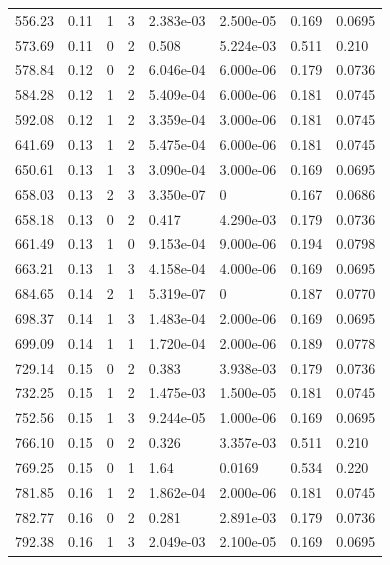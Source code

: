 \documentclass[preview]{standalone}
\begin{document}
{{{\begin{tabular}{L{1.2cm}C{1.2cm} C{0.3cm}C{0.5cm} C{1.4cm}C{1.4cm} C{1.4cm}C{1.4cm}}
  556.23  &  0.11  & 1     &  3 &  2.383e-03  & 2.500e-05  & 0.169 &  0.0695   \\ 
  573.69  &  0.11  & 0     &  2 &  0.508  & 5.224e-03  & 0.511 &  0.210   \\ 
  578.84  &  0.12  & 0     &  2 &  6.046e-04  & 6.000e-06  & 0.179 &  0.0736   \\ 
  584.28  &  0.12  & 1     &  2 &  5.409e-04  & 6.000e-06  & 0.181 &  0.0745   \\ 
  592.08  &  0.12  & 1     &  2 &  3.359e-04  & 3.000e-06  & 0.181 &  0.0745   \\ 
  641.69  &  0.13  & 1     &  2 &  5.475e-04  & 6.000e-06  & 0.181 &  0.0745   \\ 
  650.61  &  0.13  & 1     &  3 &  3.090e-04  & 3.000e-06  & 0.169 &  0.0695   \\ 
  658.03  &  0.13  & 2     &  3 &  3.350e-07  & 0  & 0.167 &  0.0686   \\ 
  658.18  &  0.13  & 0     &  2 &  0.417  & 4.290e-03  & 0.179 &  0.0736   \\ 
  661.49  &  0.13  & 1     &  0 &  9.153e-04  & 9.000e-06  & 0.194 &  0.0798   \\ 
  663.21  &  0.13  & 1     &  3 &  4.158e-04  & 4.000e-06  & 0.169 &  0.0695   \\ 
  684.65  &  0.14  & 2     &  1 &  5.319e-07  & 0  & 0.187 &  0.0770   \\ 
  698.37  &  0.14  & 1     &  3 &  1.483e-04  & 2.000e-06  & 0.169 &  0.0695   \\ 
  699.09  &  0.14  & 1     &  1 &  1.720e-04  & 2.000e-06  & 0.189 &  0.0778   \\ 
  729.14  &  0.15  & 0     &  2 &  0.383  & 3.938e-03  & 0.179 &  0.0736   \\ 
  732.25  &  0.15  & 1     &  2 &  1.475e-03  & 1.500e-05  & 0.181 &  0.0745   \\ 
  752.56  &  0.15  & 1     &  3 &  9.244e-05  & 1.000e-06  & 0.169 &  0.0695   \\ 
  766.10  &  0.15  & 0     &  2 &  0.326  & 3.357e-03  & 0.511 &  0.210   \\ 
  769.25  &  0.15  & 0     &  1 &  1.64  & 0.0169  & 0.534 &  0.220   \\ 
  781.85  &  0.16  & 1     &  2 &  1.862e-04  & 2.000e-06  & 0.181 &  0.0745   \\ 
  782.77  &  0.16  & 0     &  2 &  0.281  & 2.891e-03  & 0.179 &  0.0736   \\ 
  792.38  &  0.16  & 1     &  3 &  2.049e-03  & 2.100e-05  & 0.169 &  0.0695   \\ 

\end{tabular}}}}
\end{document}
